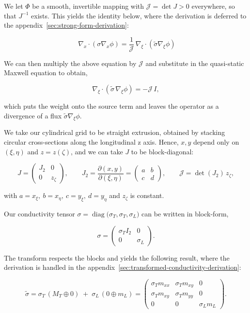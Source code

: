 \documentclass[final-report]{report-template}
\begin{document}
We let $\Phi$ be a smooth, invertible mapping with $\mathcal J=\det J>0$ everywhere, so that $J^{-1}$ exists. This yields the identity below, where the derivation is deferred to the appendix~\ref{sec:strong-form-derivation}:

$$
\;\nabla_x\!\cdot(\sigma\nabla_x\phi)=\frac{1}{\mathcal J}\,\nabla_\xi\!\cdot(\tilde\sigma\nabla_\xi\phi)
$$

We can then multiply the above equation by $\mathcal J$ and substitute in the quasi-static Maxwell equation to obtain,

$$
\nabla_\xi\!\cdot(\tilde\sigma\,\nabla_\xi\phi)=-\mathcal J\,I ,
$$

which puts the weight onto the source term and leaves the operator as a divergence of a flux $\tilde\sigma\nabla_\xi\phi$.

We take our cylindrical grid to be straight extrusion, obtained by stacking circular cross-sections along the longitudinal z axis. Hence, $x,y$ depend only on $(\xi,\eta)$ and $z=z(\zeta)$, and we can take $J$ to be block-diagonal:

$$
J=\begin{pmatrix}J_2 & 0\\ 0 & z_\zeta\end{pmatrix},
\qquad
J_2=\frac{\partial(x,y)}{\partial(\xi,\eta)}=\begin{pmatrix}a & b\\ c & d\end{pmatrix},
\qquad
\mathcal J=\det(J_2)\,z_\zeta,
$$

with $a=x_\xi,\ b=x_\eta,\ c=y_\xi,\ d=y_\eta$ and $z_\zeta$ is constant.

Our conductivity tensor $\sigma=\operatorname{diag}\big(\sigma_T,\sigma_T,\sigma_L\big)$ can be written in block-form,


$$
\sigma=\begin{pmatrix}\sigma_T I_2 & 0\\ 0 & \sigma_L\end{pmatrix}.
$$

The transform respects the blocks and yields the following result, where the derivation is handled in the appendix~\ref{sec:transformed-conductivity-derivation}:

$$
\tilde\sigma=\sigma_T\,(M_T\oplus 0)\;+\;\sigma_L\,(0\oplus m_L)
=\begin{pmatrix}\sigma_T m_{xx}&\sigma_T m_{xy}&0\\ \sigma_T m_{xy}&\sigma_T m_{yy}&0\\ 0&0&\sigma_L m_L\end{pmatrix}.
$$
\end{document}
